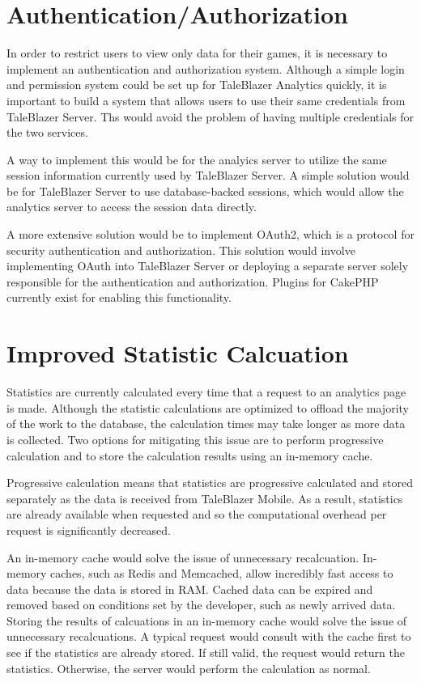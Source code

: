 \section{Authentication/Authorization}

In order to restrict users to view only data for their games, it is necessary to implement an authentication and authorization system. Although a simple login and permission system could be set up for TaleBlazer Analytics quickly, it is important to build a system that allows users to use their same credentials from TaleBlazer Server. Ths would avoid the problem of having multiple credentials for the two services. 

A way to implement this would be for the analyics server to utilize the same session information currently used by TaleBlazer Server. A simple solution would be for TaleBlazer Server to use database-backed sessions, which would allow the analytics server to access the session data directly.

A more extensive solution would be to implement OAuth2, which is a protocol for security authentication and authorization. This solution would involve implementing OAuth into TaleBlazer Server or deploying a separate server solely responsible for the authentication and authorization. Plugins for CakePHP currently exist for enabling this functionality. 

\section{Improved Statistic Calcuation}

Statistics are currently calculated every time that a request to an analytics page is made. Although the statistic calculations are optimized to offload the majority of the work to the database, the calculation times may take longer as more data is collected. Two options for mitigating this issue are to perform progressive calculation and to store the calculation results using an in-memory cache. 

Progressive calculation means that statistics are progressive calculated and stored separately as the data is received from TaleBlazer Mobile. As a result, statistics are already available when requested and so the computational overhead per request is significantly decreased. 

An in-memory cache would solve the issue of unnecessary recalcuation. In-memory caches, such as Redis and Memcached, allow incredibly fast access to data because the data is stored in RAM. Cached data can be expired and removed based on conditions set by the developer, such as newly arrived data. Storing the results of calcuations in an in-memory cache would solve the issue of unnecessary recalcuations. A typical request would consult with the cache first to see if the statistics are already stored. If still valid, the request would return the statistics. Otherwise, the server would perform the calculation as normal.

